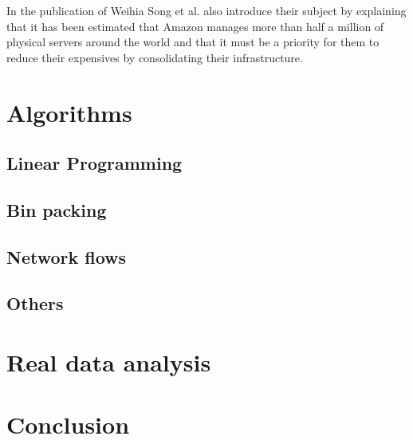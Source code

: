 \documentclass[a4paper,11pt]{article}
\begin{document}
In the publication of Weihia Song et al.\cite{reassignment:binpacking1} also
introduce their subject by explaining that it has been estimated that Amazon
manages more than half a million of physical servers around the world and that
it must be a priority for them to reduce their expensives by consolidating their
infrastructure.

\section{Algorithms}

\subsection{Linear Programming}

\subsection{Bin packing}

\subsection{Network flows}

\subsection{Others}

\section{Real data analysis}

\section*{Conclusion}

\nocite{*}


\end{document}
